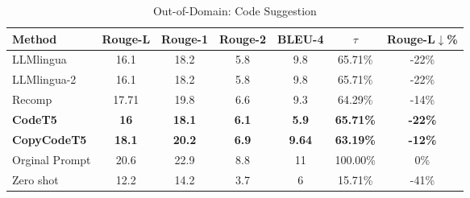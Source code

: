 \begin{table}[!htbp]
\caption{Out-of-Domain: Code Suggestion}
\begin{tabular}{l|cccccc}
\hline
Method              & \multicolumn{1}{c}{Rouge-L} & \multicolumn{1}{c}{Rouge-1} & \multicolumn{1}{c}{Rouge-2} & \multicolumn{1}{c}{BLEU-4} & $\tau$            & Rouge-L$\downarrow$\%  \\ \hline
LLMlingua           & 16.1                        & 18.2                        & 5.8                         & 9.8                        &  65.71\%          & -22\%           \\
LLMlingua-2           & 16.1                        & 18.2                        & 5.8                         & 9.8                        & 65.71\%          & -22\%           \\
Recomp       & 17.71                       & 19.8                        & 6.6                         & 9.3                        & 64.29\%          & -14\%           \\
\textbf{CodeT5}     & \textbf{16}                 & \textbf{18.1}               & \textbf{6.1}                & \textbf{5.9}               & \textbf{65.71\%} & \textbf{-22\%}  \\
\textbf{CopyCodeT5} & \textbf{18.1}               & \textbf{20.2}               & \textbf{6.9}                & \textbf{9.64}              & \textbf{63.19\%} & \textbf{-12\%}  \\ \hline
Orginal Prompt      & 20.6                        & 22.9                        & 8.8                         & 11                         & 100.00\%         & 0\%             \\
Zero shot           & 12.2                        & 14.2                        & 3.7                         & 6                          & 15.71\%          & -41\%           \\ \hline
\end{tabular}
\end{table}